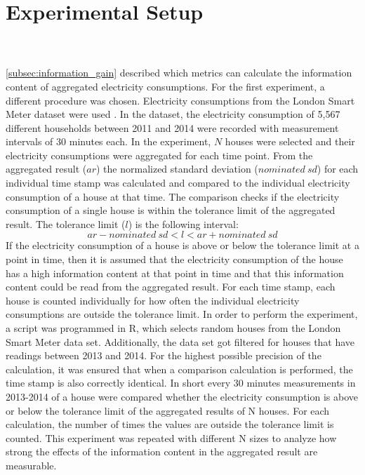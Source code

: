 \section{Experimental Setup}
\\
\\
\ref{subsec:information_gain} described which metrics can calculate the information content of aggregated electricity consumptions. For the first experiment, a different procedure was chosen. Electricity consumptions from the London Smart Meter dataset were used \cite{London}. In the dataset, the electricity consumption of 5,567 different households between 2011 and 2014 were recorded with measurement intervals of 30 minutes each. In the experiment, $N$ houses were selected and their electricity consumptions were aggregated for each time point. From the aggregated result ($ar$) the normalized standard deviation ($nominated\:sd$) for each individual time stamp was calculated and compared to the individual electricity consumption of a house at that time. The comparison checks if the electricity consumption of a single house is within the tolerance limit of the aggregated result. The tolerance limit ($l$) is the following interval:
\begin{equation}
\label{eq:tolerance}
ar - nominated\:sd< l < ar + nominated\:sd
\end{equation}
If the electricity consumption of a house is above or below the tolerance limit at a point in time, then it is assumed that the electricity consumption of the house has a high information content at that point in time and that this information content could be read from the aggregated result. For each time stamp, each house is counted individually for how often the individual electricity consumptions are outside the tolerance limit. In order to perform the experiment, a script was programmed in R, which selects random houses from the London Smart Meter data set. Additionally, the data set got filtered for houses that have readings between 2013 and 2014. For the highest possible precision of the calculation, it was ensured that when a comparison calculation is performed, the time stamp is also correctly identical. In short every 30 minutes measurements in 2013-2014 of a house were compared whether the electricity consumption is above or below the tolerance limit of the aggregated results of N houses. For each calculation, the number of times the values are outside the tolerance limit is counted. This experiment was repeated with different N sizes to analyze how strong the effects of the information content in the aggregated result are measurable.\\

